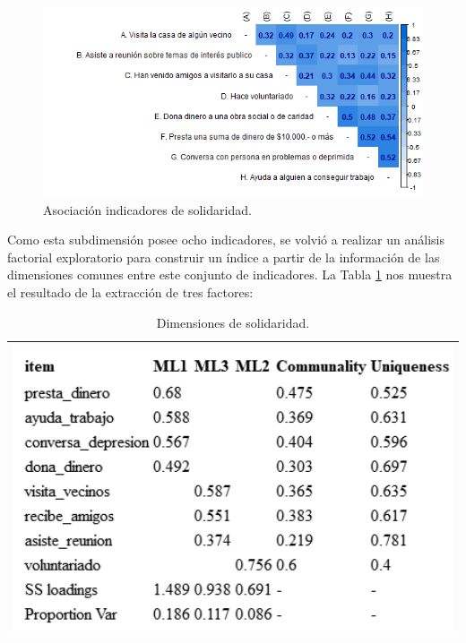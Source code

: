 \documentclass[
  12pt,
]{book}
\begin{document}
\begin{figure}[H]

{\centering \includegraphics[width=1\linewidth,height=1\textheight]{output/graphs/solidaridad_cor} 

}

\caption{Asociación indicadores de solidaridad.}\label{fig:solidaridad-cor}
\end{figure}

Como esta subdimensión posee ocho indicadores, se volvió a realizar un análisis factorial exploratorio para construir un índice a partir de la información de las dimensiones comunes entre este conjunto de indicadores. La Tabla \ref{tab:solidaridad-fa} nos muestra el resultado de la extracción de tres factores:

\begin{longtable}[]{@{}l@{}}
\caption{\label{tab:solidaridad-fa}Dimensiones de solidaridad.}\tabularnewline
\toprule
\endhead
\includegraphics[width=5.20833in,height=\textheight]{output/tables/solidaridad_fa.png} \\
\bottomrule
\end{longtable}
\end{document}
